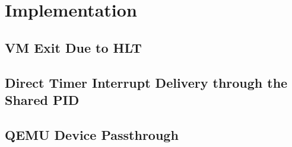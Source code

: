 \section{Implementation}


\subsection{VM Exit Due to HLT}


\subsection{Direct Timer Interrupt Delivery through the Shared PID}


\subsection{QEMU Device Passthrough}

